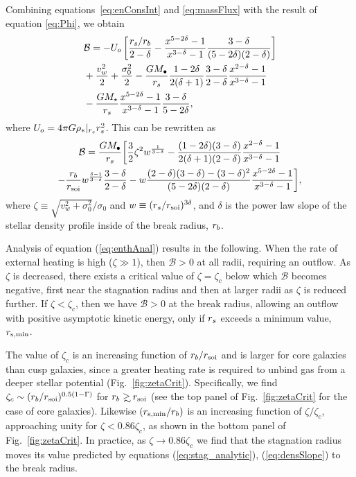 Combining equations~\eqref{eq:enConsInt} and \eqref{eq:massFlux} with
the result of equation \eqref{eq:Phi}, we obtain
\begin{align}
  &\mathcal{B} = -U_o\left[\frac{r_s/r_b}{2-\delta}-\frac{x^{5-2\delta}-1}{x^{3-\delta}-1}\frac{3-\delta}{(5-2\delta)(2-\delta)}\right]\nonumber\\
  &+\frac{v_w^2}{2}+\frac{\sigma_0^2}{2}- \frac{G M_{\bullet}}{r_s}
  \frac{1-2\delta}{2(\delta+1)}
  \frac{3-\delta}{2-\delta}\frac{x^{2-\delta}-1}{x^{3-\delta}-1}
  \nonumber\\
  &-\frac{G M_\star}{r_s}
  \frac{x^{5-2\delta}-1}{x^{3-\delta}-1}\frac{3-\delta}{5-2\delta},
\end{align}
where $U_o=4 \pi G \rho_*|_{r_s} r_s^2$.  This can be rewritten as
\begin{multline}
  \mathcal{B} =\frac{G M_{\bullet}}{r_s} \biggl[ \frac{3}{2} \zeta^2
  w^{\frac{1}{3 -\delta}}
  -\frac{(1-2\delta)(3-\delta)}{2(\delta+1)(2-\delta)}  \frac{x^{2  -\delta}-1}{x^{3-\delta}-1}\\
  -\frac{r_b}{r_{\rm soi}} w^{\frac{\delta-1}{3-\delta}} \frac{3 -\delta}{2
    -\delta} -w
  \frac{(2-\delta)(3-\delta)-(3-\delta)^{2}}{(5-2\delta)(2-\delta)}
  \frac{x^{5-2\delta}-1}{x^{3-\delta}-1} \biggr],
\label{eq:enthAnal}
\end{multline}
where $\zeta \equiv \sqrt{v_w^2+\sigma_0^2}/\sigma_0$ and $w\equiv
(r_s/r_{\rm soi})^{3\delta}$, and $\delta$ is the power law slope of the
stellar density profile inside of the break radius, $r_b$.

Analysis of equation (\ref{eq:enthAnal}) results in the following.  When the rate of external heating is high ($\zeta \gg 1$), then $\mathcal{B} > 0$ at all radii, requiring an outflow.  As $\zeta$ is decreased, there exists a critical value of $\zeta = \zeta_{c}$ below which $\mathcal{B}$ becomes negative, first near the stagnation radius and then at larger radii as $\zeta$ is reduced further.  If $\zeta<\zeta_c$, then we have $\mathcal{B} > 0$ at the break radius, allowing an outflow with positive asymptotic kinetic energy, only if $r_s$ exceeds a minimum value, $r_{\rm s,min}$.  

The value of $\zeta_c$ is an increasing function of $r_{b}/r_{\rm soi}$ and is larger for core galaxies than cusp galaxies, since a greater heating rate is required to unbind gas from a deeper stellar potential (Fig.~\ref{fig:zetaCrit}).  Specifically, we find $\zeta_c\sim (r_b/r_{\rm soi})^{0.5(1-\Gamma)}$ for $\rb\gsim\rsoi$ (see the top panel of
Fig.~\ref{fig:zetaCrit} for the case of core galaxies). Likewise $(r_{\rm s,min}/r_{b})$ is an increasing function of $\zeta/\zeta_{c}$, approaching unity for $\zeta < 0.86\zeta_c$, as shown in the
bottom panel of Fig.~\ref{fig:zetaCrit}.  In practice, as $\zeta \rightarrow 0.86\zeta_c$ we find that the stagnation radius moves its value predicted by equations (\ref{eq:stag_analytic}), (\ref{eq:densSlope}) to the break radius.  


